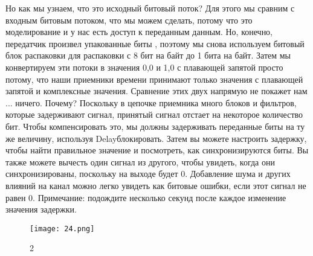 \documentclass[10pt,a4paper,oneside]{article}
\begin{document}
Но как мы узнаем, что это исходный битовый поток? Для этого мы сравним с входным битовым потоком, что мы можем сделать, потому что это моделирование и у нас есть доступ к переданным данным. Но, конечно, передатчик произвел упакованные биты , поэтому мы снова используем битовый блок распаковки для распаковки с 8 бит на байт до 1 бита на байт. Затем мы конвертируем эти потоки в значения 0,0 и 1,0 с плавающей запятой просто потому, что наши приемники времени принимают только значения с плавающей запятой и комплексные значения. Сравнение этих двух напрямую не покажет нам ... ничего. Почему? Поскольку в цепочке приемника много блоков и фильтров, которые задерживают сигнал, принятый сигнал отстает на некоторое количество бит. Чтобы компенсировать это, мы должны задерживать переданные биты на ту же величину, используя Delayблокировать. Затем вы можете настроить задержку, чтобы найти правильное значение и посмотреть, как синхронизируются биты. Вы также можете вычесть один сигнал из другого, чтобы увидеть, когда они синхронизированы, поскольку на выходе будет 0. Добавление шума и других влияний на канал можно легко увидеть как битовые ошибки, если этот сигнал не равен 0. Примечание: подождите несколько секунд после каждое изменение значения задержки.

\begin{figure}[H]
        \centering
        \texttt{[image: 24.png]}
        \caption{2}
        \label{fig:first}
\end{figure}
\end{document}
